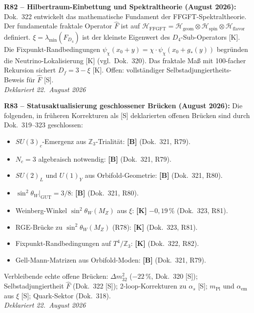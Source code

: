 \medskip
\textbf{R82 -- Hilbertraum-Einbettung und Spektraltheorie (August 2026):} Dok.~322 entwickelt das mathematische Fundament der FFGFT-Spektraltheorie. Der fundamentale fraktale Operator $\hat{F}$ ist auf $\mathcal{H}_{\mathrm{FFGFT}} = \mathcal{H}_{\mathrm{geom}}\otimes\mathcal{H}_{\mathrm{spin}}\otimes\mathcal{H}_{\mathrm{flavor}}$ definiert. $\xi = \lambda_{\min}(\hat{F}_{D_4})$ ist der kleinste Eigenwert des $D_4$-Sub-Operators [K]. Die Fixpunkt-Randbedingungen $\psi_\chi(x_0+y) = \chi\cdot\psi_\chi(x_0+g_*(y))$ begründen die Neutrino-Lokalisierung [K] (vgl.\ Dok.~320). Das fraktale Maß mit 100-facher Rekursion sichert $D_f = 3-\xi$ [K]. Offen: vollständiger Selbstadjungiertheits-Beweis für $\hat{F}$ [S].\\
\emph{Deklariert 22.~August 2026}

\medskip
\textbf{R83 -- Statusaktualisierung geschlossener Brücken (August 2026):} Die folgenden, in früheren Korrekturen als [S] deklarierten offenen Brücken sind durch Dok.~319--323 geschlossen:
\begin{itemize}
  \item $SU(3)_c$-Emergenz aus $\mathbb{Z}_3$-Trialität: \textbf{[B]} (Dok.~321, R79).
  \item $N_c = 3$ algebraisch notwendig: \textbf{[B]} (Dok.~321, R79).
  \item $SU(2)_L$ und $U(1)_Y$ aus Orbifold-Geometrie: \textbf{[B]} (Dok.~321, R80).
  \item $\sin^2\theta_W|_{\mathrm{GUT}} = 3/8$: \textbf{[B]} (Dok.~321, R80).
  \item Weinberg-Winkel $\sin^2\theta_W(M_Z)$ aus $\xi$: \textbf{[K]} $-0{,}19\,\%$ (Dok.~323, R81).
  \item RGE-Brücke zu $\sin^2\theta_W(M_Z)$ (R78): \textbf{[K]} (Dok.~323, R81).
  \item Fixpunkt-Randbedingungen auf $T^4/\mathbb{Z}_3$: \textbf{[K]} (Dok.~322, R82).
  \item Gell-Mann-Matrizen aus Orbifold-Moden: \textbf{[B]} (Dok.~321, R79).
\end{itemize}
Verbleibende echte offene Brücken: $\Delta m_{32}^2$ ($-22\,\%$, Dok.~320 [S]); Selbstadjungiertheit $\hat{F}$ (Dok.~322 [S]); 2-loop-Korrekturen zu $\alpha_s$ [S]; $m_{\mathrm{Pl}}$ und $\alpha_{\mathrm{em}}$ aus $\xi$ [S]; Quark-Sektor (Dok.~318).\\
\emph{Deklariert 22.~August 2026}

